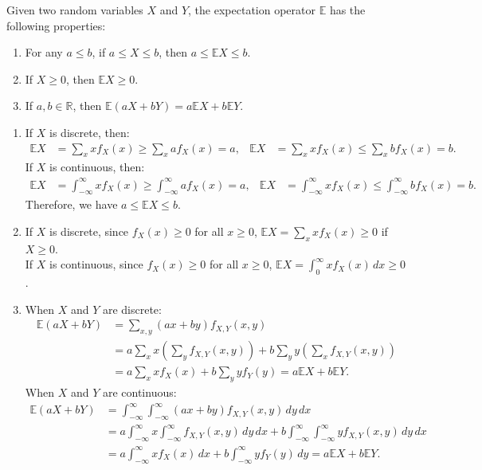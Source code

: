 \documentclass{huhtakm-template-book-v2}
\newcommand{\expect}{\mathbb{E}}
\begin{document}
    \begin{thm}
        Given two random variables $X$ and $Y$, the expectation operator $\expect$ has the following properties:
        \begin{enumerate}
            \item For any $a \leq b$, if $a \leq X \leq b$, then $a \leq \expect{X} \leq b$.
            \item If $X \geq 0$, then $\expect{X} \geq 0$.
            \item If $a,b \in \mathbb{R}$, then $\expect(aX+bY) = a\expect{X}+b\expect{Y}$.
        \end{enumerate}
    \end{thm}
    \begin{proofing}
        \begin{enumerate}
            \item If $X$ is discrete, then:
            \begin{align*}
                \expect{X} &= \sum_{x}xf_{X}(x) \geq \sum_{x}af_{X}(x) = a, & \expect{X} &= \sum_{x}xf_{X}(x) \leq \sum_{x}bf_{X}(x) = b.
            \end{align*}
            If $X$ is continuous, then:
            \begin{align*}
                \expect{X} &= \int_{-\infty}^{\infty} xf_{X}(x) \geq \int_{-\infty}^{\infty} af_{X}(x) = a, & \expect{X} &= \int_{-\infty}^{\infty} xf_{X}(x) \leq \int_{-\infty}^{\infty} bf_{X}(x) = b.
            \end{align*}
            Therefore, we have $a \leq \expect{X} \leq b$.
            \item If $X$ is discrete, since $f_{X}(x) \geq 0$ for all $x \geq 0$, $\expect{X} = \sum_{x}xf_{X}(x) \geq 0$ if $X \geq 0$.\\
            If $X$ is continuous, since $f_{X}(x) \geq 0$ for all $x \geq 0$, $\expect{X} = \int_{0}^{\infty}xf_{X}(x)\,dx \geq 0$.
            \item When $X$ and $Y$ are discrete:
            \begin{align*}
                \expect(aX+bY) &= \sum_{x,y}(ax+by)f_{X,Y}(x, y)\\
                &= a\sum_{x}x\left(\sum_{y}f_{X,Y}(x, y)\right)+b\sum_{y}y\left(\sum_{x}f_{X,Y}(x, y)\right)\\
                &= a\sum_{x}xf_{X}(x)+b\sum_{y}yf_{Y}(y) = a\expect{X}+b\expect{Y}.
            \end{align*}
            When $X$ and $Y$ are continuous:
            \begin{align*}
                \expect(aX+bY) &= \int_{-\infty}^{\infty}\int_{-\infty}^{\infty}(ax+by)f_{X,Y}(x, y)\,dy\,dx\\
                &= a\int_{-\infty}^{\infty} x\int_{-\infty}^{\infty} f_{X,Y}(x, y)\,dy\,dx+b\int_{-\infty}^{\infty}\int_{-\infty}^{\infty} yf_{X,Y}(x, y)\,dy\,dx\\
                &= a\int_{-\infty}^{\infty} xf_{X}(x)\,dx+b\int_{-\infty}^{\infty} yf_{Y}(y)\,dy = a\expect{X}+b\expect{Y}.
            \end{align*}
        \end{enumerate}
    \end{proofing}
\end{document}
